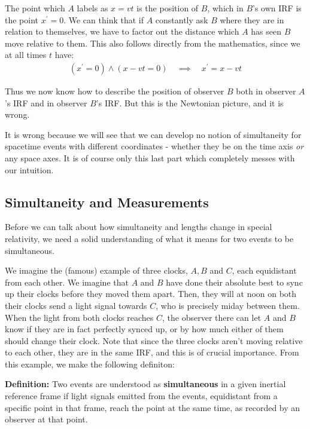 \documentclass[a4paper]{article}
\begin{document}
   The point which \(A\) labels as \(x = vt\) is the position of \(B\), which in \(B\)'s own IRF is the point \(x^{\prime} = 0\). We can think that if \(A\)  constantly ask \(B\) where they are in relation to themselves, we have to factor out the distance which \(A\) has seen \(B\) move relative to them. This also follows directly from the mathematics, since we at all times \(t\) have:
   \begin{align*}
    (x^{\prime} = 0) \land (x - vt = 0) \quad \implies\quad x^{\prime} = x - vt
   \end{align*} 

   Thus we now know how to describe the position of observer \(B\) both in observer \(A\)'s IRF and in observer \(B\)'s IRF. But this is the Newtonian picture, and it is wrong. 
   
   It is wrong because we will see that we can develop no notion of simultaneity for spacetime events with different coordinates - whether they be on the time axis \textit{or} any space axes. It is of course only this last part which completely messes with our intuition.

   \subsection{Simultaneity and Measurements}
   Before we can talk about how simultaneity and lengths change in special relativity, we need a solid understanding of what it means for two events to be simultaneous. 

   We imagine the (famous) example of three clocks, \(A, B\) and \(C\), each equidistant from each other. We imagine that \(A\) and \(B\) have done their absolute best to sync up their clocks before they moved them apart. Then, they will at noon on both their clocks send a light signal towards \(C\), who is precisely miday between them. When the light from both clocks reaches \(C\), the observer there can let \(A\) and \(B\) know if they are in fact perfectly synced up, or by how much either of them should change their clock. Note that since the three clocks aren't moving relative to each other, they are in the same IRF, and this is of crucial importance. From this example, we make the following definiton:

   \textbf{Definition:} Two events are understood as \textbf{simultaneous} in a given inertial reference frame if light signals emitted from the events, equidistant from a specific point in that frame, reach the point at the same time, as recorded by an observer at that point.
\end{document}
